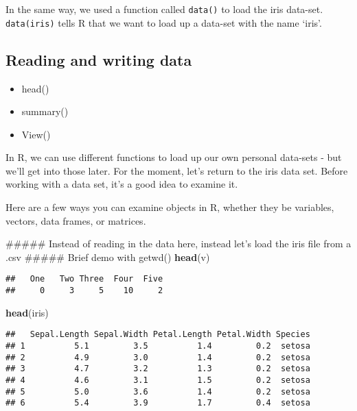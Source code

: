 \documentclass[]{article}
\newenvironment{Shaded}{\begin{snugshade}}{\end{snugshade}}
\newcommand{\KeywordTok}[1]{\textcolor[rgb]{0.13,0.29,0.53}{\textbf{#1}}}
\newcommand{\NormalTok}[1]{#1}
\providecommand{\tightlist}{%
  \setlength{\itemsep}{0pt}\setlength{\parskip}{0pt}}
\begin{document}
In the same way, we used a function called \texttt{data()} to load the
iris data-set. \texttt{data(\textquotesingle{}iris\textquotesingle{})}
tells R that we want to load up a data-set with the name `iris'.

\subsection{Reading and writing data}\label{reading-and-writing-data}

\begin{itemize}
\tightlist
\item
  head()
\item
  summary()
\item
  View()
\end{itemize}

In R, we can use different functions to load up our own personal
data-sets - but we'll get into those later. For the moment, let's return
to the iris data set. Before working with a data set, it's a good idea
to examine it.

Here are a few ways you can examine objects in R, whether they be
variables, vectors, data frames, or matrices.

\begin{Shaded}
\begin{Highlighting}[]
\NormalTok{##### Instead of reading in the data here, instead let's load the iris file from a .csv}
\NormalTok{##### Brief demo with getwd()}
\KeywordTok{head}\NormalTok{(v)}
\end{Highlighting}
\end{Shaded}

\begin{verbatim}
##   One   Two Three  Four  Five 
##     0     3     5    10     2
\end{verbatim}

\begin{Shaded}
\begin{Highlighting}[]
\KeywordTok{head}\NormalTok{(iris)}
\end{Highlighting}
\end{Shaded}

\begin{verbatim}
##   Sepal.Length Sepal.Width Petal.Length Petal.Width Species
## 1          5.1         3.5          1.4         0.2  setosa
## 2          4.9         3.0          1.4         0.2  setosa
## 3          4.7         3.2          1.3         0.2  setosa
## 4          4.6         3.1          1.5         0.2  setosa
## 5          5.0         3.6          1.4         0.2  setosa
## 6          5.4         3.9          1.7         0.4  setosa
\end{verbatim}
\end{document}
